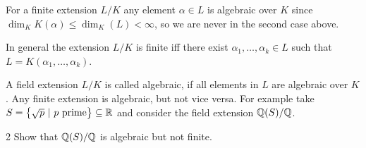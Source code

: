 \documentclass[twoside = false,	%
		headsepline,		%
		parskip = true,
		]{scrbook}						%
\begin{document}
        For a finite extension $L/K$ any element $\alpha \in L$ is algebraic over $K$ since $\dim_K K(\alpha) \leq \dim_K(L) < \infty$, so we are never in the second case above.
        
        In general the extension $L/K$ is finite iff there exist $\alpha_1,\dots,\alpha_k \in L$ such that $L = K(\alpha_1,\dots,\alpha_k)$.
        
        A field extension $L/K$ is called algebraic, if all elements in $L$ are algebraic over $K$. Any finite extension is algebraic, but not vice versa. For example take $S = \left\{\sqrt{p} \ | \ p \text{ prime} \right\} \subseteq \mathbb R$ and consider the field extension $\mathbb Q(S)/\mathbb Q$.
        
        \begin{exercise}{}{2}
            Show that $\mathbb Q(S)/\mathbb Q$ is algebraic but not finite.
        \end{exercise}
        
\end{document}

